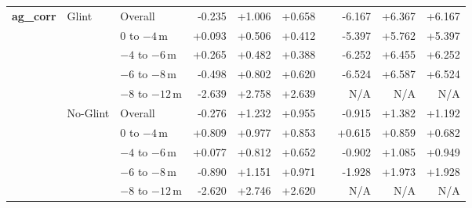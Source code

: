 \begin{table}[htbp]
{\begin{tabular}{lll rrr c rrr}
\multirow{10}{*}{\textbf{ag\_corr}} & \multirow{5}{*}{Glint} & Overall              &  -0.235 & +1.006 & +0.658 & &  -6.167 & +6.367 & +6.167 \\
                           &                      & $0$ to $-4$\,m       &  +0.093 & +0.506 & +0.412 & &  -5.397 & +5.762 & +5.397 \\
                           &                      & $-4$ to $-6$\,m      &  +0.265 & +0.482 & +0.388 & &  -6.252 & +6.455 & +6.252 \\
                           &                      & $-6$ to $-8$\,m      &  -0.498 & +0.802 & +0.620 & &  -6.524 & +6.587 & +6.524 \\
                           &                      & $-8$ to $-12$\,m     &  -2.639 & +2.758 & +2.639 & &     N/A &   N/A &   N/A \\
\cmidrule(lr){2-10}
                           & \multirow{5}{*}{No-Glint} & Overall              &  -0.276 & +1.232 & +0.955 & &  -0.915 & +1.382 & +1.192 \\
                           &                      & $0$ to $-4$\,m       &  +0.809 & +0.977 & +0.853 & &  +0.615 & +0.859 & +0.682 \\
                           &                      & $-4$ to $-6$\,m      &  +0.077 & +0.812 & +0.652 & &  -0.902 & +1.085 & +0.949 \\
                           &                      & $-6$ to $-8$\,m      &  -0.890 & +1.151 & +0.971 & &  -1.928 & +1.973 & +1.928 \\
                           &                      & $-8$ to $-12$\,m     &  -2.620 & +2.746 & +2.620 & &     N/A &   N/A &   N/A \\
\midrule


\end{tabular}}
\end{table}
